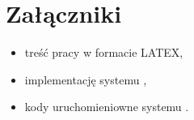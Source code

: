 \newpage\section{Załączniki}
\begin{itemize}
	\item treść pracy w formacie LATEX,
	\item implementację systemu \NazwaSys,
	\item kody uruchomieniowne systemu \NazwaSys. 
\end{itemize} 
